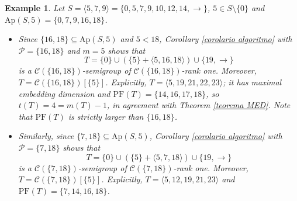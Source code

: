 \documentclass[11pt]{article}
\newtheorem{example}[theorem]{Example}
\numberwithin{equation}{section}
\newcommand{\PF}{\mathrm{PF}}
\begin{document}
\begin{example}
    Let $S=\langle5,7,9\rangle=\{0,5,7,9,10,12,14,\rightarrow\}$, $5\in S\setminus\{0\}$ and $\mathrm{Ap}(S,5)=\{0,7,9,16,18\}$.
    \begin{itemize}
        \item Since $\{16,18\}\subseteq\mathrm{Ap}(S,5)$ and $5<18$, Corollary \ref{corolario algoritmo} with $\mathcal P=\{16,18\}$ and $m=5$ shows that
        \[
        T=\{0\}\cup(\{5\}+\langle5,16,18\rangle)\cup\{19,\rightarrow\}
        \]
        is a $\mathcal C(\{16,18\})$-semigroup of $\mathcal C(\{16,18\})$-rank one. Moreover, $T=\mathcal C(\{16,18\})[\{5\}]$. Explicitly, $T=\langle 5,19,21,22,23\rangle$; it has maximal embedding dimension and $\PF(T)=\{14,16,17,18\}$, so $t(T)=4=m(T)-1$, in agreement with Theorem \ref{teorema MED}. Note that $\PF(T)$ is strictly larger than $\{16,18\}$.
        \item Similarly, since $\{7,18\}\subseteq\mathrm{Ap}(S,5)$, Corollary \ref{corolario algoritmo} with $\mathcal P=\{7,18\}$ shows that
        \[
        T=\{0\}\cup(\{5\}+\langle5,7,18\rangle)\cup\{19,\rightarrow\}
        \]
        is a $\mathcal C(\{7,18\})$-semigroup of $\mathcal C(\{7,18\})$-rank one. Moreover, $T=\mathcal C(\{7,18\})[\{5\}]$. Explicitly, $T=\langle 5,12,19,21,23\rangle$ and $\PF(T)=\{7,14,16,18\}$.
    \end{itemize}
\end{example}
\end{document}
